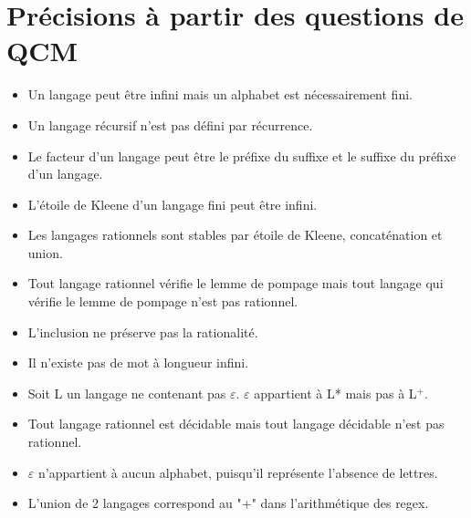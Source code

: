 \documentclass{article}
\begin{document}
\section{Précisions à partir des questions de QCM}
\begin{itemize}
	\item Un langage peut être infini mais un alphabet est nécessairement fini.
	\item Un langage récursif n'est pas défini par récurrence.
	\item Le facteur d'un langage peut être le préfixe du suffixe et le suffixe du préfixe d'un langage.
	\item L'étoile de Kleene d'un langage fini peut être infini.
	\item Les langages rationnels sont stables par étoile de Kleene, concaténation et union.
	\item Tout langage rationnel vérifie le lemme de pompage mais tout langage qui vérifie le lemme de pompage n'est pas rationnel.
	\item L'inclusion ne préserve pas la rationalité.
	\item Il n'existe pas de mot à longueur infini.
    	\item Soit L un langage ne contenant pas $\varepsilon$. $\varepsilon$ appartient à L* mais pas à L$^{+}$.
    	\item Tout langage rationnel est décidable mais tout langage décidable n'est pas rationnel.
    	\item $\varepsilon$ n'appartient à aucun alphabet, puisqu'il représente l'absence de lettres.
    	\item L'union de 2 langages correspond au "+" dans l'arithmétique des regex.
\end{itemize}
\end{document}
